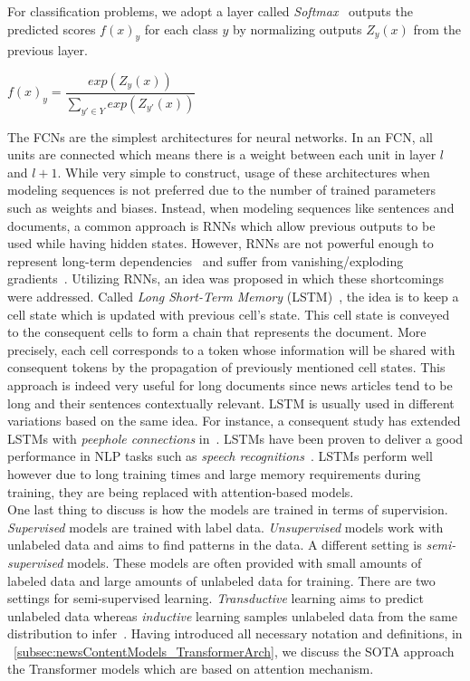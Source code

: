 For classification problems, we adopt a layer called \emph{Softmax}~\parencite{Softmax_Bridle} outputs the predicted scores $f(x)_y$ for each class $y$ by normalizing outputs $Z_y(x)$ from the previous layer.\\
\begin{center}
    $f(x)_y = \dfrac{exp(Z_y(x))}{\sum\limits_{{y'} \in Y} exp(Z_{y'}(x))}$
\end{center}
The FCNs are the simplest architectures for neural networks. In an FCN, all units are connected which means there is a weight between each unit in layer $l$ and $l+1$. While very simple to construct, usage of these architectures when modeling sequences is not preferred due to the number of trained parameters such as weights and biases. Instead, when modeling sequences like sentences and documents, a common approach is RNNs which allow previous outputs to be used while having hidden states. However, RNNs are not powerful enough to represent long-term dependencies~\parencite{LearningLongTermDependenciesHard_Bengio} and suffer from vanishing/exploding gradients~\parencite{OnTheDifficultyOfTrainingRNNs_Pascanu}. Utilizing RNNs, an idea was proposed in which these shortcomings were addressed. Called \emph{Long Short-Term Memory} (LSTM)~\parencite{LSTM_Hochreiter}, the idea is to keep a cell state which is updated with previous cell's state. This cell state is conveyed to the consequent cells to form a chain that represents the document. More precisely, each cell corresponds to a token whose information will be shared with consequent tokens by the propagation of previously mentioned cell states. This approach is indeed very useful for long documents since news articles tend to be long and their sentences contextually relevant. LSTM is usually used in different variations based on the same idea. For instance, a consequent study has extended LSTMs with \emph{peephole connections} in~\parencite{LSTMPeephole_Gers}. LSTMs have been proven to deliver a good performance in NLP tasks such as \emph{speech recognitions}~\parencite{AchievingHumanParityinConvSR_Wayne}. LSTMs perform well however due to long training times and large memory requirements during training, they are being replaced with attention-based models.\\
One last thing to discuss is how the models are trained in terms of supervision. \emph{Supervised} models are trained with label data. \emph{Unsupervised} models work with unlabeled data and aims to find patterns in the data. A different setting is \emph{semi-supervised} models. These models are often provided with small amounts of labeled data and large amounts of unlabeled data for training. There are two settings for semi-supervised learning. \emph{Transductive} learning aims to predict unlabeled data whereas \emph{inductive} learning samples unlabeled data from the same distribution to
infer~\parencite{LearningByTransduction_Gammerman}. Having introduced all necessary notation and definitions, in ~\ref{subsec:newsContentModels_TransformerArch}, we discuss the SOTA approach the Transformer models which are based on attention mechanism.

